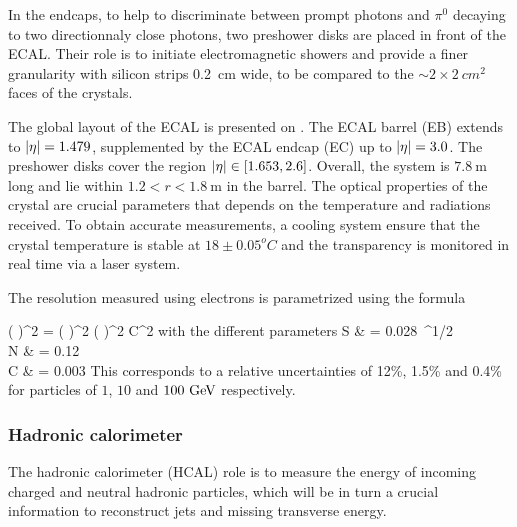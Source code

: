         In the endcaps, to help to discriminate between prompt photons and $\pi^0$ decaying
        to two directionnaly close photons, two preshower disks are placed in front of the
        ECAL. Their role is to initiate electromagnetic showers and provide a finer granularity
        with silicon strips 0.2~cm wide, to be compared to the $\sim2\times2~cm^2$ faces
        of the crystals.


        The global layout of the ECAL is presented on . The ECAL
        barrel (EB) extends to $\left| \eta \right| = 1.479$, supplemented by the ECAL endcap (EC)
        up to $\left| \eta \right| = 3.0$. The preshower disks cover the region $\left| \eta \right| \in [1.653,2.6]$.
        Overall, the system is $7.8~\text{m}$ long and lie within $1.2 < r < 1.8~\text{m}$
        in the barrel.
        The optical properties of the crystal are crucial parameters that depends on the
        temperature and radiations received. To obtain accurate measurements, a cooling
        system ensure that the crystal temperature is stable at $18\pm0.05^oC$ and the
        transparency is monitored in real time via a laser system.

        The resolution measured using electrons is parametrized using the formula

        {
            \left(  \right)^2
            =
            \left(  \right)^2
            \oplus
            \left(  \right)^2
            \oplus
            C^2
        }
        with the different parameters
        {
            S & = 0.028~^{1/2} \nonumber\\
            N & = 0.12~\\
            C & = 0.003\nonumber
        }
        This corresponds to a relative uncertainties of 12\%, 1.5\% and 0.4\% for particles
        of $1$, $10$ and $100~\text{GeV}$ respectively.

            \subsubsection{Hadronic calorimeter}

        The hadronic calorimeter (HCAL) role is to measure the energy of incoming charged
        and neutral hadronic particles, which will be in turn a crucial information to
        reconstruct jets and missing transverse energy.

